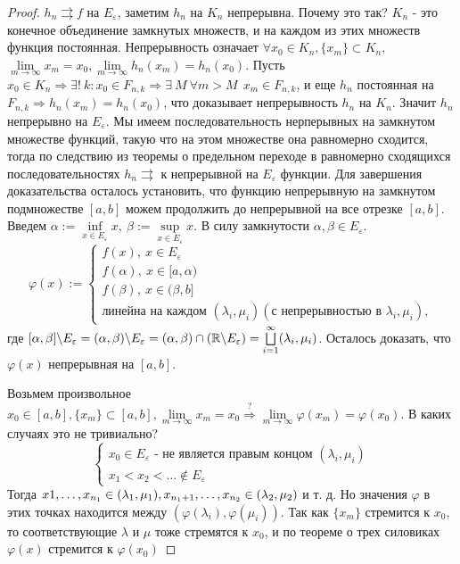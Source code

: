 \begin{proof}
$h_n \rightrightarrows f$ на $E_{\varepsilon}$, заметим $h_n \text{ на } K_n$ непрерывна. Почему это так? $K_n$ - это конечное объединение замкнутых множеств, и на каждом из этих множеств функция постоянная. Непрерывность означает $\forall x_0 \in K_n, \{x_m\}\subset K_n,$ ${ \lim\limits_{m\to\infty}x_m = x_0}, \lim\limits_{m\to\infty}h_n(x_m)=h_n(x_0).$ Пусть $x_0 \in K_n \Rightarrow \exists !\ k : x_0 \in F_{n, k} \Rightarrow \exists\ M\  \forall m > M\ \ x_m \in F_{n,k}$, и еще $h_n$ постоянная на $F_{n,k} \Rightarrow h_n(x_m)=h_n(x_0)$, что доказывает непрерывность $h_n$ на $K_n$. Значит $h_n$ непрерывно на $E_{\varepsilon}$. Мы имеем последовательность нерперывных на замкнутом множестве функций, такую что на этом множестве она равномерно сходится, тогда по следствию из теоремы о предельном переходе в равномерно сходящихся последовательностях $h_n \rightrightarrows$ к непрерывной на $E_{\varepsilon}$ функции. Для завершения доказательства осталось установить, что функцию непрерывную на замкнутом подмножестве $[a,b]$ можем продолжить до непрерывной на все отрезке $[a,b]$. Введем $\alpha := \inf\limits_{x\in E_\varepsilon}x,\ \beta := \sup\limits_{x\in E_\varepsilon}x$. В силу замкнутости $\alpha, \beta \in E_\varepsilon$.
\begin{equation*}
\varphi (x) := \begin{cases}
f(x),\ x\in E_\varepsilon\\
f(\alpha),\ x \in [a,\alpha)\\
f(\beta),\ x \in (\beta, b]\\
\text{линейна на каждом }(\lambda_i, \mu_i) (\text{с непрерывностью в }\lambda_i, \mu_i),
\end{cases}
\end{equation*}
где $[\alpha, \beta]\backslash E_\varepsilon = (\alpha, \beta)\backslash E_\varepsilon = (\alpha, \beta)\cap(\mathbb{R} \backslash E_\varepsilon)=\bigsqcup\limits_{i=1}^\infty(\lambda_i, \mu_i)$. Осталось доказать, что $\varphi (x)$ непрерывная на $[a,b].$

Возьмем произвольное $x_0 \in [a,b], \{x_m\}\subset [a,b], \lim\limits_{m\to\infty}x_m=x_0 \overset{?}{\Rightarrow} \lim\limits_{m\to\infty}\varphi (x_m)=\varphi (x_0)$. В каких случаях это не тривиально? 
\begin{equation*}
\begin{cases}
 x_0 \in E_\varepsilon\text{ - не является правым концом } (\lambda_i, \mu_i) \\
 x_1 < x_2 < \ldots \notin E_\varepsilon
\end{cases}
\end{equation*}
Тогда $x1,\ldots, x_{n_1} \in (\lambda_1, \mu_1),\newline x_{n_1+1}, \ldots, x_{n_2} \in (\lambda_2, \mu_2)$ и т. д. Но значения $\varphi$ в этих точках находится между $(\varphi(\lambda_i),\varphi( \mu_i)).$ Так как $\{x_m\}$ стремится к $x_0$, то соответствующие $\lambda$ и $\mu$ тоже стремятся к $x_0$, и по теореме о трех силовиках $\varphi(x)$ стремится к $\varphi(x_0)$


\end{proof}
